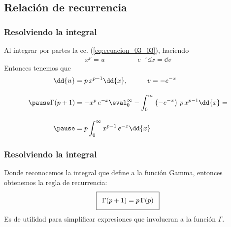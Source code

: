 \subsection{Relación de recurrencia}
\begin{frame}
\frametitle{Resolviendo la integral}
Al integrar por partes la ec. (\ref{eq:ecuacion_03_03}), haciendo
\begin{align*}
x^{p} =  u \hspace{2cm} e^{-x} \dd{x} =  \dd{v}
\end{align*}
\pause
Entonces tenemos que
\begin{eqnarray*}
\dd{u} &= p \, x^{p-1} \dd{x}, \hspace{1cm} v = - e^{-x} \\[1em]
\pause
\Gamma (p+1) &= -x^{p} \, e^{-x} \displaystyle \eval_{0}^{\infty} - \displaystyle \int_{0}^{\infty} \left(-e^{-x} \right) \, p \, x^{p-1} \dd{x} = \\[1em]
\pause
&= p \displaystyle \int_{0}^{\infty} x^{p-1} \, e^{-x} \dd{x}
\end{eqnarray*}
\end{frame}
\begin{frame}
\frametitle{Resolviendo la integral}
Donde reconocemos la integral que define a la función Gamma, entonces obtenemos la regla de recurrencia:  
\begin{align}
\addtolength{\fboxsep}{5pt}\boxed{
\Gamma (p+1) = p \, \Gamma (p)}
\label{eq:ecuacion_03_04}
\end{align}
Es de utilidad para simplificar expresiones que involucran a la función $\Gamma$.
\end{frame}

